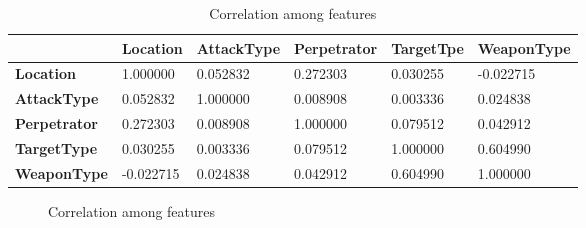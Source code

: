 \documentclass[journal,onecolumn,11pt]{IEEEtran}
\begin{document}
\begin{itemize}
\begin{table}[h!]
\begin{tabular}{|l|l|l|l|l|l|}
\hline
 & \textbf{Location} & \textbf{AttackType} & \textbf{Perpetrator} & \textbf{TargetTpe} & \textbf{WeaponType} \\ \hline
\textbf{Location} & 1.000000 & 0.052832 & 0.272303 & 0.030255 & -0.022715 \\ \hline
\textbf{AttackType} & 0.052832 & 1.000000 & 0.008908 & 0.003336 & 0.024838 \\ \hline
\textbf{Perpetrator} & 0.272303 & 0.008908 & 1.000000 & 0.079512 & 0.042912 \\ \hline
\textbf{TargetType} & 0.030255 & 0.003336 & 0.079512 & 1.000000 & 0.604990 \\ \hline
\textbf{WeaponType} & -0.022715 & 0.024838 & 0.042912 & 0.604990 & 1.000000 \\ \hline
\end{tabular}
\centering
\caption{Correlation among features}
\label{my-label}
\end{table}


\begin{figure}[h!]
    \centering
    \def\svgwidth{0.5\columnwidth}
    
    
    \caption{Correlation among features}
\end{figure}

\end{itemize}
\end{document}
